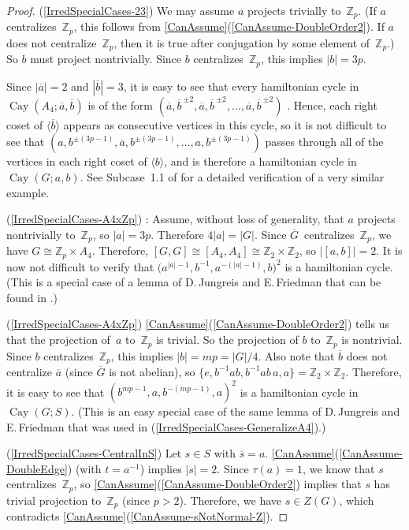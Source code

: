 \documentclass[]{amcjoucc}
\renewcommand{\Cref}{\cref}
\newcommand{\pref}[1]{(\ref{#1})}
\newcommand{\fullcref}[2]{\cref{#1}\pref{#1-#2}}
\newcommand{\fullCref}[2]{\Cref{#1}\pref{#1-#2}}
\theoremstyle{plain}
\theoremstyle{definition}
\theoremstyle{definition}
\DeclareMathOperator{\Cay}{Cay}
\newcommand{\iso}{\cong}
\newcommand{\quot}{\overline}
\newcommand{\ZZ}{\mathbb{Z}}
\begin{document}
\begin{proof}
\pref{IrredSpecialCases-23}
We may assume $a$ projects trivially to~$\ZZ_p$. (If $a$ centralizes~$\ZZ_p$, this follows from \fullcref{CanAssume}{DoubleOrder2}. If $a$ does not centralize~$\ZZ_p$, then it is true after conjugation by some element of~$\ZZ_p$.) So $b$ must project nontrivially. Since $b$ centralizes~$\ZZ_p$, this implies $|b| = 3p$.

Since $|\quot a| = 2$ and $|\quot b| = 3$, it is easy to see that every hamiltonian cycle in $\Cay(A_4; \quot a, \quot b)$ is of the form
	$ (\quot a, {\quot b\,}^{\pm2}, \quot a, {\quot b\,}^{\pm2}, \ldots, \quot a, {\quot b\,}^{\pm2} ) $
\cite[p.~238]{Schupp-structure}. Hence, each right coset of $\langle \quot b \rangle$ appears as consecutive vertices in this cycle, so it is not difficult to see that 
	$ (  a, b^{\pm(3p-1)}, \quot a, b^{\pm(3p-1)}, \ldots, a, b^{\pm(3p-1)} ) $
passes through all of the vertices in each right coset of $\langle b \rangle$, and is therefore a hamiltonian cycle in $\Cay(G; a,b)$. See Subcase~1.1 of \cite[\S3]{Morris-nonsolvable} for a detailed verification of a very similar example.

\pref{IrredSpecialCases-A4xZp}
\cite[Subcase~2.2 of Prop.~7.2]{M2Slovenian-LowOrder}:
Assume, without loss of generality, that $a$ projects nontrivially to~$\ZZ_p$, so $|a| = 3p$. Therefore $4  |a| = |G|$.
Since $\quot G$~centralizes~$\ZZ_p$, we have $G \iso \ZZ_p \times A_4$. Therefore, $[G,G] \iso [A_4, A_4] \iso \ZZ_2 \times \ZZ_2$, so $| [a,b] | = 2$. 
It is now not difficult to verify that 
	$\bigl( a^{|a|-1}, b^{-1}, a^{-(|a|-1)}, b \bigr)^2$
is a hamiltonian cycle. (This is a special case of a lemma of D.\,Jungreis and E.\,Friedman that can be found in \cite[2.14]{M2Slovenian-LowOrder}.)

\pref{IrredSpecialCases-A4xZp}
 \fullCref{CanAssume}{DoubleOrder2} tells us that the projection of~$a$ to~$\ZZ_p$ is trivial. So the projection of $b$ to~$\ZZ_p$ is nontrivial. Since $b$ centralizes~$\ZZ_p$, this implies $|b| = mp = |G|/4$. Also note that $\quot b$ does not centralize $\quot a$ (since $\quot G$ is not abelian), so $\{e, b^{-1}a b, b^{-1}a b \, a, a\} = \ZZ_2 \times \ZZ_2$. Therefore, it is easy to see that
 	$ (b^{mp-1}, a, b^{-(mp-1)}, a)^2$
is a hamiltonian cycle in $\Cay(G;S)$. (This is an easy special case of the same lemma of D.\,Jungreis and E.\,Friedman that was used in \pref{IrredSpecialCases-GeneralizeA4}.) 

\pref{IrredSpecialCases-CentralInS} Let $s \in S$ with $\quot s = a$. \fullCref{CanAssume}{DoubleEdge} (with $t = a^{-1}$) implies $|s| = 2$.  Since $\tau(a) = 1$, we know that $s$ centralizes~$\ZZ_p$, so \fullcref{CanAssume}{DoubleOrder2} implies that $s$ has trivial projection to~$\ZZ_p$ (since $p > 2$). Therefore, we have $s \in Z(G)$, which contradicts \fullcref{CanAssume}{sNotNormal-Z}.


\end{proof}
\end{document}
